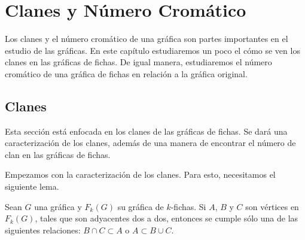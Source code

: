 \chapter{Clanes y N\'umero Crom\'atico}%
\label{cap:Clique-ChromNum}
Los clanes y el n\'umero crom\'atico de una gr\'afica son partes importantes en
el estudio de las gr\'aficas. En este cap\'itulo estudiaremos un poco el c\'omo
se ven los clanes en las gr\'aficas de fichas. De igual manera, estudiaremos el
n\'umero crom\'atico de una gr\'afica de fichas en relaci\'on a la gr\'afica
original.

\section{Clanes}%
\label{sec:clanes}

Esta secci\'on est\'a enfocada en los clanes de las gr\'aficas de fichas. Se
dar\'a una caracterizaci\'on de los clanes, adem\'as de una manera de encontrar
el n\'umero de clan en las gr\'aficas de fichas.

Empezamos con la caracterizaci\'on de los clanes. Para esto, necesitamos el
siguiente lema.

\begin{lema}%
\label{lem:K3}
    Sean $G$ una gr\'afica y $F_k(G)$ su gr\'afica de $k$-fichas. Si $A$, $B$ y
    $C$ son v\'ertices en $F_k(G)$, tales que son adyacentes dos a dos, entonces
    se cumple s\'olo una de las siguientes relaciones: $B \cap C \subset A$ o $A
    \subset B \cup C$.
\end{lema}

